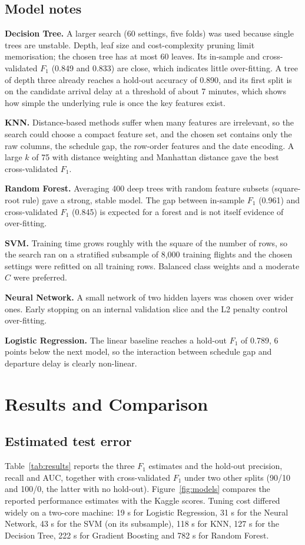 \documentclass[12pt,a4paper]{article}
\newcommand{\Fone}{$F_1$}
\begin{document}
\subsection{Model notes}
\textbf{Decision Tree.} A larger search (60 settings, five folds) was used because single trees are unstable. Depth, leaf size and cost-complexity pruning limit memorisation; the chosen tree has at most 60 leaves. Its in-sample and cross-validated \Fone{} (0.849 and 0.833) are close, which indicates little over-fitting. A tree of depth three already reaches a hold-out accuracy of 0.890, and its first split is on the candidate arrival delay at a threshold of about 7 minutes, which shows how simple the underlying rule is once the key features exist.

\textbf{KNN.} Distance-based methods suffer when many features are irrelevant, so the search could choose a compact feature set, and the chosen set contains only the raw columns, the schedule gap, the row-order features and the date encoding. A large $k$ of 75 with distance weighting and Manhattan distance gave the best cross-validated \Fone{}.

\textbf{Random Forest.} Averaging 400 deep trees with random feature subsets (square-root rule) gave a strong, stable model. The gap between in-sample \Fone{} (0.961) and cross-validated \Fone{} (0.845) is expected for a forest and is not itself evidence of over-fitting.

\textbf{SVM.} Training time grows roughly with the square of the number of rows, so the search ran on a stratified subsample of 8,000 training flights and the chosen settings were refitted on all training rows. Balanced class weights and a moderate $C$ were preferred.

\textbf{Neural Network.} A small network of two hidden layers was chosen over wider ones. Early stopping on an internal validation slice and the L2 penalty control over-fitting.

\textbf{Logistic Regression.} The linear baseline reaches a hold-out \Fone{} of 0.789, 6 points below the next model, so the interaction between schedule gap and departure delay is clearly non-linear.

\section{Results and Comparison}
\subsection{Estimated test error}
Table~\ref{tab:results} reports the three \Fone{} estimates and the hold-out precision, recall and AUC, together with cross-validated \Fone{} under two other splits (90/10 and 100/0, the latter with no hold-out). Figure~\ref{fig:models} compares the reported performance estimates with the Kaggle scores. Tuning cost differed widely on a two-core machine: 19 s for Logistic Regression, 31 s for the Neural Network, 43 s for the SVM (on its subsample), 118 s for KNN, 127 s for the Decision Tree, 222 s for Gradient Boosting and 782 s for Random Forest.
\end{document}
